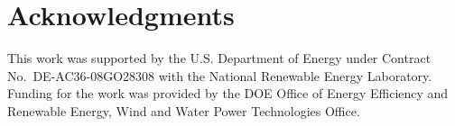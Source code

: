 \documentclass{aiaa-tc}
\begin{document}
\section*{Acknowledgments} 

This work was supported by the U.S. Department of Energy under Contract No.\
DE-AC36-08GO28308 with the National Renewable Energy Laboratory. Funding for the work was provided by the DOE Office of Energy Efficiency and Renewable Energy, Wind and Water Power Technologies Office.   



\end{document}
